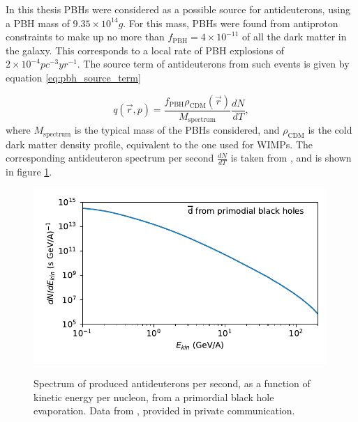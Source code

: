 In this thesis PBHs were considered as a possible source for antideuterons, using a PBH mass of $9.35\times 10^{14}g$. For this mass, PBHs were found from antiproton constraints to make up no more than $f_\mathrm{PBH} = 4\times 10^{-11}$ of all the dark matter in the galaxy. This corresponds to a local rate of PBH explosions of $2\times 10^{-4} pc^{-3}yr^{-1}$. The source term of antideuterons from such events is given by equation \ref{eq:pbh_source_term}

\begin{equation}\label{eq:pbh_source_term}
	q(\vec{r}, p) = \frac{f_\mathrm{PBH} \rho_{\mathrm{CDM}} (\vec{r})}{M_\mathrm{spectrum}}\frac{dN}{dT},
\end{equation}
where $M_\mathrm{spectrum}$ is the typical mass of the PBHs considered, and $\rho_\mathrm{CDM}$ is the cold dark matter density profile, equivalent to the one used for WIMPs. The corresponding antideuteron spectrum per second $\frac{dN}{dT}$ is taken from \cite{Ibarra:2012cc}, and is shown in figure \ref{fig:pbh_source_spectrum}.

\begin{figure}
		\centering
		\includegraphics[width=0.99\textwidth]{figures/pbh_source_spectrum_dbar.pdf}
		\label{fig:pbh_source_spectrum}
		\caption{Spectrum of produced antideuterons per second, as a function of kinetic energy per nucleon, from a primordial black hole evaporation. Data from \cite{Ibarra:2012cc}, provided in private communication.}
\end{figure}



